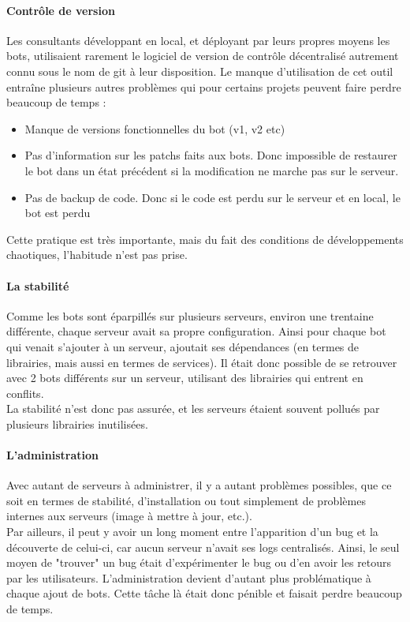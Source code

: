 \documentclass{article} %
\begin{document}
\paragraph{Contrôle de version}
Les consultants développant en local, et déployant par leurs propres moyens les bots,  utilisaient rarement le logiciel de version de contrôle décentralisé autrement connu sous le nom de git à leur disposition.
Le manque d'utilisation de cet outil entraîne plusieurs autres problèmes qui pour certains projets peuvent faire perdre beaucoup de temps :
\begin{itemize}
 \item Manque de versions fonctionnelles du bot (v1, v2 etc)
 \item Pas d'information sur les patchs faits aux bots. Donc impossible de restaurer le bot dans un état précédent si la modification ne marche pas sur le serveur.
 \item Pas de backup de code. Donc si le code est perdu sur le serveur et en local, le bot est perdu
\end{itemize}
Cette pratique est très importante, mais du fait des conditions de développements chaotiques, l'habitude n'est pas prise.

\paragraph{La stabilité}
Comme les bots sont éparpillés sur plusieurs serveurs, environ une trentaine différente, chaque serveur avait sa propre configuration. Ainsi pour chaque bot qui venait s'ajouter à un serveur, ajoutait ses dépendances (en termes de librairies, mais aussi en termes de services). Il était donc possible de se retrouver avec 2 bots différents sur un serveur, utilisant des librairies qui entrent en conflits.\\
La stabilité n'est donc pas assurée, et les serveurs étaient souvent pollués par plusieurs librairies inutilisées.

\paragraph{L'administration}
Avec autant de serveurs à administrer, il y a autant problèmes possibles, que ce soit en termes de stabilité, d'installation ou tout simplement de problèmes internes aux serveurs (image à mettre à jour, etc.).\\
Par ailleurs, il peut y avoir un long moment entre l'apparition d'un bug et la découverte de celui-ci, car aucun serveur n'avait ses logs centralisés. Ainsi, le seul moyen de "trouver" un bug était d'expérimenter le bug ou d'en avoir les retours par les utilisateurs. L'administration devient d'autant plus problématique à chaque ajout de bots. Cette tâche là était donc pénible et faisait perdre beaucoup de temps.
\end{document}
